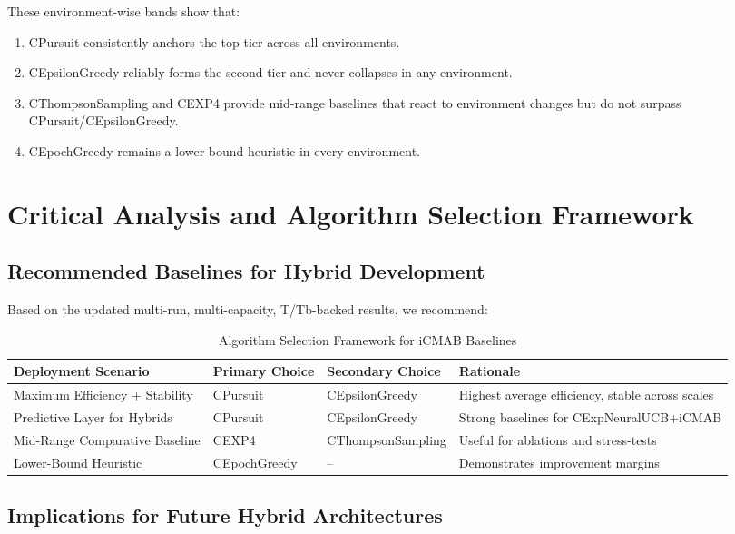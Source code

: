 \documentclass[12pt,a4paper]{article}
\begin{document}
These environment-wise bands show that:

\begin{enumerate}
\item CPursuit consistently anchors the top tier across all environments.
\item CEpsilonGreedy reliably forms the second tier and never collapses in any environment.
\item CThompsonSampling and CEXP4 provide mid-range baselines that react to environment changes but do not surpass CPursuit/CEpsilonGreedy.
\item CEpochGreedy remains a lower-bound heuristic in every environment.
\end{enumerate}

\newpage
\section{Critical Analysis and Algorithm Selection Framework}

\subsection{Recommended Baselines for Hybrid Development}

Based on the updated multi-run, multi-capacity, T/Tb-backed results, we recommend:

\begin{table}[H]
\centering
\caption{Algorithm Selection Framework for iCMAB Baselines}
\begin{tabular}{|l|l|l|l|}
\hline
\textbf{Deployment Scenario} & \textbf{Primary Choice} & \textbf{Secondary Choice} & \textbf{Rationale} \\
\hline
\hline
Maximum Efficiency + Stability & CPursuit & CEpsilonGreedy & Highest average efficiency, stable across scales \\
Predictive Layer for Hybrids   & CPursuit & CEpsilonGreedy & Strong baselines for CExpNeuralUCB+iCMAB \\
Mid-Range Comparative Baseline & CEXP4    & CThompsonSampling & Useful for ablations and stress-tests \\
Lower-Bound Heuristic          & CEpochGreedy & --           & Demonstrates improvement margins \\
\hline
\end{tabular}
\end{table}

\subsection{Implications for Future Hybrid Architectures}
\end{document}
